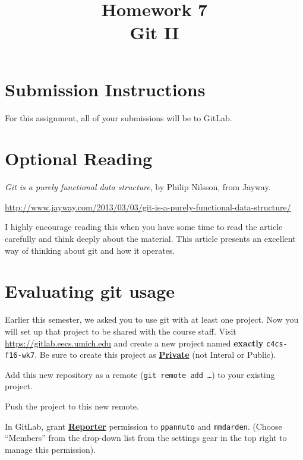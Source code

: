 \documentclass{article}
\begin{document}
\fancyhead[C]{}
\fancyhead[L]{}
\fancyhead[R]{}

\fancyfoot[C]{\color{gray} \thepage~/~\pageref*{LastPage}}
\pagestyle{fancyplain}


\title{\textbf{Homework 7\\Git II}}
\author{\textbf{\color{violet}{Solutions}}}
\date{}
\maketitle


\section*{Submission Instructions}
For this assignment, all of your submissions will be to GitLab.

\section*{Optional Reading}

\emph{Git is a purely functional data structure}, by Philip Nilsson, from Jayway.

\url{http://www.jayway.com/2013/03/03/git-is-a-purely-functional-data-structure/}

I highly encourage reading this when you have some time to read the article
carefully and think deeply about the material.
This article presents an excellent way of thinking about git and how it
operates.



\section{Evaluating git usage}

Earlier this semester, we asked you to use git with at least one project. Now
you will set up that project to be shared with the course staff. Visit
\url{https://gitlab.eecs.umich.edu} and create a new project named
\textbf{exactly} \texttt{c4cs-f16-wk7}.
Be sure to create this project as
\textbf{\ul{Private}} (not Interal or Public).

Add this new repository as a remote (\texttt{git remote add \dots}) to your
existing project.

Push the project to this new remote.

In GitLab, grant \textbf{\ul{Reporter}} permission to \texttt{ppannuto} and
\texttt{mmdarden}.
(Choose ``Members'' from the drop-down list from the settings gear in the top
right to manage this permission).
\end{document}
